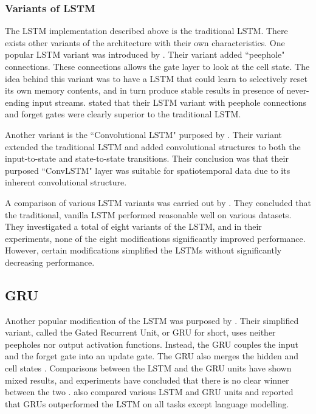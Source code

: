 \subsubsection{Variants of LSTM}
The LSTM implementation described above is the traditional LSTM. There exists other variants of the architecture with their own characteristics. One popular LSTM variant was introduced by \citep{gers2001lstm}. Their variant added ``peephole" connections. These connections allows the gate layer to look at the cell state. The idea behind this variant was to have a LSTM that could learn to selectively reset its own memory contents, and in turn produce stable results in presence of never-ending input streams. \citep{gers2001lstm} stated that their LSTM variant with peephole connections and forget gates were clearly superior to the traditional LSTM. 

Another variant is the ``Convolutional LSTM" purposed by \citep{xingjian2015convolutional}. Their variant extended the traditional LSTM and added convolutional structures to both the input-to-state and state-to-state transitions. Their conclusion was that their purposed ``ConvLSTM" layer was suitable for spatiotemporal data due to its inherent convolutional structure.

A comparison of various LSTM variants was carried out by \citep{greff2016lstm}. They concluded that the traditional, vanilla LSTM performed reasonable well on various datasets. They investigated a total of eight variants of the LSTM, and in their experiments, none of the eight modifications significantly improved performance. However, certain modifications simplified the LSTMs without significantly decreasing performance. 

\subsection{GRU}
Another popular modification of the LSTM was purposed by \citep{chung2014empirical}. Their simplified variant, called the Gated Recurrent Unit, or GRU for short, uses neither peepholes nor output activation functions. Instead, the GRU couples the input and the forget gate into an update gate. The GRU also merges the hidden and cell states  \citep{greff2016lstm, chung2014empirical}. Comparisons between the LSTM and the GRU units have shown mixed results, and experiments have concluded that there is no clear winner between the two \citep{greff2016lstm, chung2014empirical}. \citep{jozefowicz2015empirical} also compared various LSTM and GRU units and reported that GRUs outperformed the LSTM on all tasks except language modelling.

